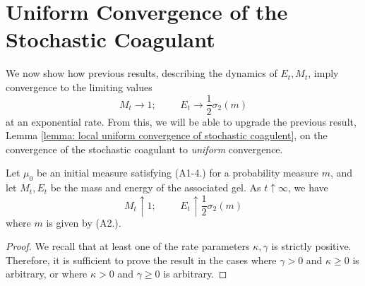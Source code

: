\section{Uniform Convergence of the Stochastic Coagulant} \label{sec: uniform convergence} We now show how previous results, describing the dynamics of $E_t, M_t$, imply convergence to the limiting values \begin{equation} M_t\rightarrow 1;\hspace{1cm} E_t\rightarrow \frac{1}{2}\sigma_2(m) \end{equation} at an exponential rate.  From this, we will be able to upgrade the previous result, Lemma \ref{lemma: local uniform convergence of stochastic coagulent}, on the convergence of the stochastic coagulant to \emph{uniform} convergence. \begin{lemma}\label{lemma: M and E at infinity} Let $\mu_0$ be an initial measure satisfying (A1-4.) for a probability measure $m$, and let $M_t, E_t$ be the mass and energy of the associated gel. As $t\uparrow \infty$, we have \begin{equation}
    M_t\uparrow 1; \hspace{1cm}E_t\uparrow  \frac{1}{2}\sigma_2(m)
\end{equation} where $m$ is given by (A2.). \end{lemma} \begin{proof} We recall that at least one of the rate parameters $\kappa, \gamma$ is strictly positive. Therefore, it is sufficient to prove the result in the cases where $\gamma>0$ and $\kappa \ge 0$ is arbitrary, or where $\kappa>0$ and $\gamma \ge 0$ is arbitrary.

\end{proof}
